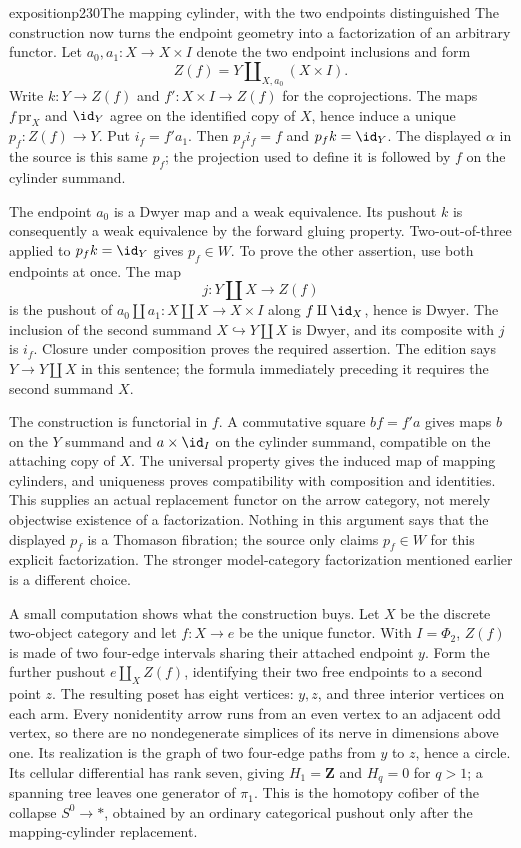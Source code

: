 \begin{dcomment}{exposition}{p230}{The mapping cylinder, with the two endpoints distinguished}
The construction now turns the endpoint geometry into a factorization of an arbitrary functor. Let $a_0,a_1:X\to X\times I$ denote the two endpoint inclusions and form
\[
 Z(f)=Y\amalg_{X,a_0}(X\times I).
\]
Write $k:Y\to Z(f)$ and $f':X\times I\to Z(f)$ for the coprojections. The maps $f\,\mathrm{pr}_X$ and $\id_Y$ agree on the identified copy of $X$, hence induce a unique $p_f:Z(f)\to Y$. Put $i_f=f'a_1$. Then $p_fi_f=f$ and $p_fk=\id_Y$. The displayed $\alpha$ in the source is this same $p_f$; the projection used to define it is followed by $f$ on the cylinder summand.

The endpoint $a_0$ is a Dwyer map and a weak equivalence. Its pushout $k$ is consequently a weak equivalence by the forward gluing property. Two-out-of-three applied to $p_fk=\id_Y$ gives $p_f\in W$. To prove the other assertion, use both endpoints at once. The map
\[
 j:Y\amalg X\longrightarrow Z(f)
\]
is the pushout of $a_0\amalg a_1:X\amalg X\to X\times I$ along $f\amalg\id_X$, hence is Dwyer. The inclusion of the second summand $X\hookrightarrow Y\amalg X$ is Dwyer, and its composite with $j$ is $i_f$. Closure under composition proves the required assertion. The edition says $Y\to Y\amalg X$ in this sentence; the formula immediately preceding it requires the second summand $X$.

The construction is functorial in $f$. A commutative square $bf=f'a$ gives maps $b$ on the $Y$ summand and $a\times\id_I$ on the cylinder summand, compatible on the attaching copy of $X$. The universal property gives the induced map of mapping cylinders, and uniqueness proves compatibility with composition and identities. This supplies an actual replacement functor on the arrow category, not merely objectwise existence of a factorization. Nothing in this argument says that the displayed $p_f$ is a Thomason fibration; the source only claims $p_f\in W$ for this explicit factorization. The stronger model-category factorization mentioned earlier is a different choice.

A small computation shows what the construction buys. Let $X$ be the discrete two-object category and let $f:X\to e$ be the unique functor. With $I=\Phi_2$, $Z(f)$ is made of two four-edge intervals sharing their attached endpoint $y$. Form the further pushout $e\amalg_X Z(f)$, identifying their two free endpoints to a second point $z$. The resulting poset has eight vertices: $y,z$, and three interior vertices on each arm. Every nonidentity arrow runs from an even vertex to an adjacent odd vertex, so there are no nondegenerate simplices of its nerve in dimensions above one. Its realization is the graph of two four-edge paths from $y$ to $z$, hence a circle. Its cellular differential has rank seven, giving $H_1=\mathbf Z$ and $H_q=0$ for $q>1$; a spanning tree leaves one generator of $\pi_1$. This is the homotopy cofiber of the collapse $S^0\to *$, obtained by an ordinary categorical pushout only after the mapping-cylinder replacement.
\end{dcomment}

